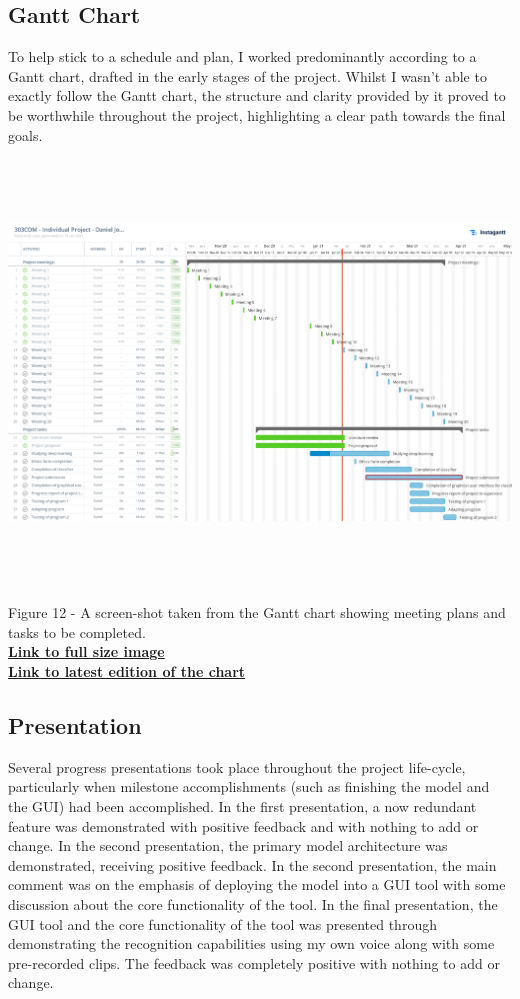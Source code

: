 \documentclass[12pt]{article}
\begin{document}
\subsection{Gantt Chart}
To help stick to a schedule and plan, I worked predominantly according to a Gantt chart, drafted in the early stages of the project. Whilst I wasn't able to exactly follow the Gantt chart, the structure and clarity provided by it proved to be worthwhile throughout the project, highlighting a clear path towards the final goals.
\\

\includegraphics[width=18cm, height=12cm]{Daniel_Jones_Gantt_Chart}
Figure 12 - A screen-shot taken from the Gantt chart showing meeting plans and tasks to be completed.
\\
\noindent \href{https://i.imgur.com/9tchO4N.jpg}{\color{blue}\textbf{Link to full size image}}
\\
\noindent \href{https://app.instagantt.com/shared/s/PdaKZZeApqszVu1eftjC/latest}{\color{blue}\textbf{Link to latest edition of the chart}}
\subsection{Presentation}
Several progress presentations took place throughout the project life-cycle, particularly when milestone accomplishments (such as finishing the model and the GUI) had been accomplished. In the first presentation, a now redundant feature was demonstrated with positive feedback and with nothing to add or change. In the second presentation, the primary model architecture was demonstrated, receiving positive feedback. In the second presentation, the main comment was on the emphasis of deploying the model into a GUI tool with some discussion about the core functionality of the tool. In the final presentation, the GUI tool and the core functionality of the tool was presented through demonstrating the recognition capabilities using my own voice along with some pre-recorded clips. The feedback was completely positive with nothing to add or change.
\end{document}
